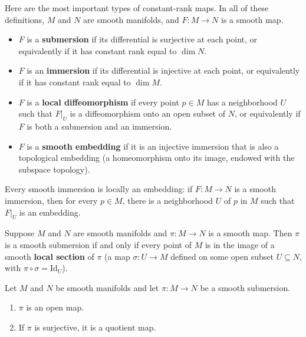 Here are the most important types of constant-rank maps. In all of these definitions, $M$ and $N$ are smooth manifolds, and $F: M \to N$ is a smooth map.

\begin{itemize}
\item $F$ is a \textbf{submersion} if its differential is surjective at each point, or equivalently if it has constant rank equal to $\dim N$.
\item $F$ is an \textbf{immersion} if its differential is injective at each point, or equivalently if it has constant rank equal to $\dim M$.
\item $F$ is a \textbf{local diffeomorphism} if every point $p \in M$ has a neighborhood $U$ such that $F|_U$ is a diffeomorphism onto an open subset of $N$, or equivalently if $F$ is both a submersion and an immersion.
\item $F$ is a \textbf{smooth embedding} if it is an injective immersion that is also a topological embedding (a homeomorphism onto its image, endowed with the subspace topology).
\end{itemize}

\begin{theorem}
\label{thm:local-embedding-theorem}
Every smooth immersion is locally an embedding: if $F: M \to N$ is a smooth immersion, then for every $p \in M$, there is a neighborhood $U$ of $p$ in $M$ such that $F|_U$ is an embedding.
\end{theorem}

\begin{theorem}
\label{thm:local-section-theorem}
Suppose $M$ and $N$ are smooth manifolds and $\pi: M \to N$ is a smooth map. Then $\pi$ is a smooth submersion if and only if every point of $M$ is in the image of a smooth \textbf{local section} of $\pi$ (a map $\sigma: U \to M$ defined on some open subset $U \subseteq N$, with $\pi \circ \sigma = \text{Id}_U$).
\end{theorem}

\begin{proposition}
\label{prop:properties-of-submersions}
Let $M$ and $N$ be smooth manifolds and let $\pi: M \to N$ be a smooth submersion.
\begin{enumerate}[label=(\alph*)]
\item $\pi$ is an open map.
\item If $\pi$ is surjective, it is a quotient map.
\end{enumerate}
\end{proposition}

